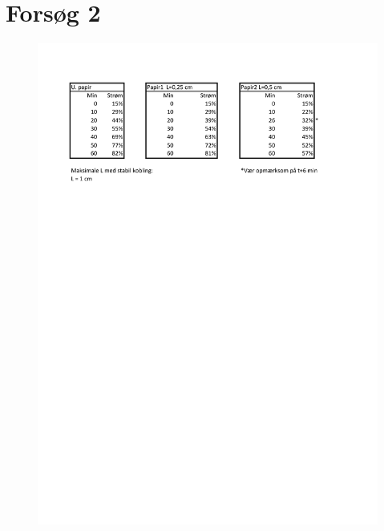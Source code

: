 \chapter{Forsøg 2} \label{forsg2}

\begin{figure}[htbp]

\centering
\includegraphics[scale=1]{Setup/forsg_2_bilag}
\label{figure:forsg2}

\end{figure}
